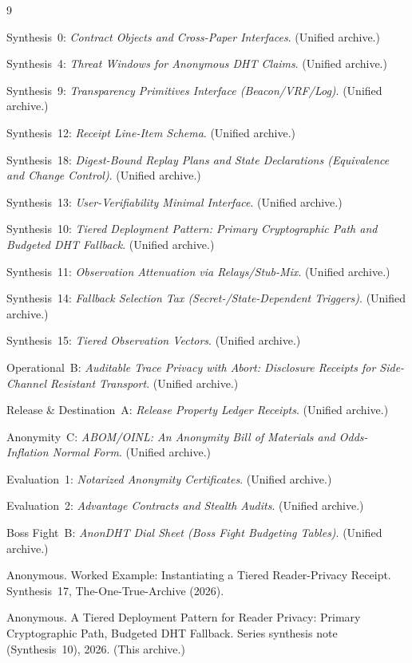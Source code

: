 \documentclass[11pt]{article}
\begin{document}
\begin{thebibliography}{9}

Synthesis~0: \emph{Contract Objects and Cross-Paper Interfaces}. (Unified archive.)

Synthesis~4: \emph{Threat Windows for Anonymous DHT Claims}. (Unified archive.)

Synthesis~9: \emph{Transparency Primitives Interface (Beacon/VRF/Log)}. (Unified archive.)

Synthesis~12: \emph{Receipt Line-Item Schema}. (Unified archive.)

Synthesis~18: \emph{Digest-Bound Replay Plans and State Declarations (Equivalence and Change Control)}. (Unified archive.)

Synthesis~13: \emph{User-Verifiability Minimal Interface}. (Unified archive.)

Synthesis~10: \emph{Tiered Deployment Pattern: Primary Cryptographic Path and Budgeted DHT Fallback}. (Unified archive.)

Synthesis~11: \emph{Observation Attenuation via Relays/Stub-Mix}. (Unified archive.)

Synthesis~14: \emph{Fallback Selection Tax (Secret-/State-Dependent Triggers)}. (Unified archive.)

Synthesis~15: \emph{Tiered Observation Vectors}. (Unified archive.)

Operational~B: \emph{Auditable Trace Privacy with Abort: Disclosure Receipts for Side-Channel Resistant Transport}. (Unified archive.)

Release \& Destination~A: \emph{Release Property Ledger Receipts}. (Unified archive.)

Anonymity~C: \emph{ABOM/OINL: An Anonymity Bill of Materials and Odds-Inflation Normal Form}. (Unified archive.)

Evaluation~1: \emph{Notarized Anonymity Certificates}. (Unified archive.)

Evaluation~2: \emph{Advantage Contracts and Stealth Audits}. (Unified archive.)

Boss Fight~B: \emph{AnonDHT Dial Sheet (Boss Fight Budgeting Tables)}. (Unified archive.)


Anonymous.
\newblock Worked Example: Instantiating a Tiered Reader-Privacy Receipt.
\newblock Synthesis~17, The-One-True-Archive (2026).


Anonymous.
\newblock A Tiered Deployment Pattern for Reader Privacy: Primary Cryptographic Path, Budgeted DHT Fallback.
\newblock Series synthesis note (Synthesis~10), 2026. (This archive.)

\end{thebibliography}
\end{document}

